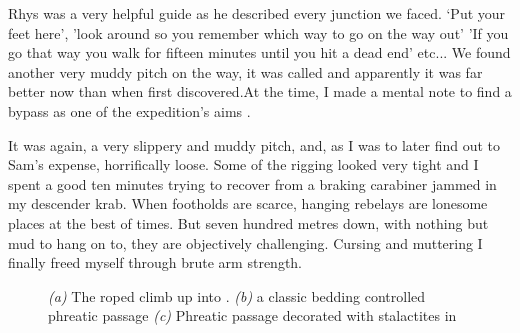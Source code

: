 Rhys was a very helpful guide as he described every junction we faced. `Put your feet here', 'look around so you remember which way to go on the way out' 'If you go that way you walk for fifteen minutes until you hit a dead end' etc... We found another very muddy pitch on the way,  it was called and apparently it was far better now than when first discovered.At the time, I made a mental note to find a bypass as one of the expedition's aims . 


It was again, a very slippery and muddy pitch, and, as I was to later find out to Sam's expense, horrifically loose. Some of the rigging looked very tight and I spent a good ten minutes trying to recover from a braking carabiner jammed in my descender krab. When footholds are scarce, hanging rebelays are lonesome places at the best of times. But seven hundred metres down, with nothing but mud to hang on to, they are objectively challenging. Cursing and muttering I finally freed myself through brute arm strength.

\begin{figure}[t!]
\checkoddpage \ifoddpage \forcerectofloat \else \forceversofloat \fi
\centering
    \begin{subfigure}[t]{0.393\textwidth}
        \centering
        \caption{} \label{HelmsDeep}
    \end{subfigure}
        \hfill
\begin{subfigure}[t]{0.59\textwidth}
\centering
{}
 \caption{}\label{fig:amazinggrace}
\end{subfigure}
    \vspace{0cm}
    \begin{subfigure}[t]{\textwidth}
    \centering
        \caption{} \label{Atlantis}
    \end{subfigure}
    \caption{
    \emph{(a)} The roped climb up into \protect{}.  
     \emph{(b)} \protect{} a classic bedding controlled phreatic passage
     \emph{(c)} Phreatic passage decorated with stalactites in \protect{} }
     \label{fig:atlantis}
\end{figure}

